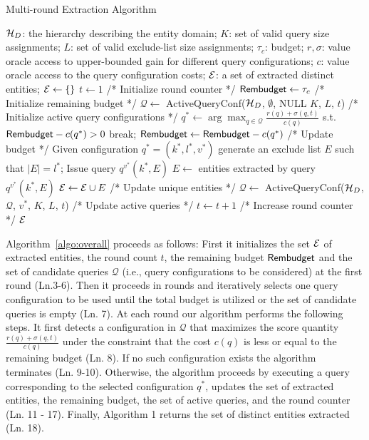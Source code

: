 \begin{algorithm}[h]
\small\caption{Multi-round Extraction Algorithm}
\label{algo:overall}
\begin{algorithmic}[1]
 $\mathcal{H}_D$: the hierarchy describing the entity domain; $K$: set of valid query size assignments; $L$: set of valid exclude-list size assignments; $\tau_c$: budget; $r,\sigma$: value oracle access to upper-bounded gain for different query configurations; $c$: value oracle access to the query configuration costs;
 $\mathcal{E}$: a set of extracted distinct entities;
\STATE $\mathcal{E} \leftarrow \{\}$
\STATE $t \leftarrow 1$ /* Initialize round counter */
\STATE ${\sf Rembudget} \leftarrow \tau_c$ /* Initialize remaining budget */
\STATE $\mathcal{Q} \leftarrow$ {\sf ActiveQueryConf($\mathcal{H}_D$, $\emptyset$, NULL $K$, $L$, $t$)} /* Initialize active query configurations */
	\STATE $q^* \leftarrow \arg\max_{q \in {\mathcal{Q}}} \frac{r(q)+\sigma(q,t)}{c(q)}$ s.t. ${\sf Rembudget} - c(q^*) >0$
		\STATE break;
	\ENDIF
	\STATE ${\sf Rembudget} \leftarrow {\sf Rembudget} - c(q^*)$ /* Update budget */
	\STATE Given configuration $q^* = (k^*,l^*,v^*)$ generate an exclude list $E$ such that $|E| = l^*$; 
	\STATE Issue query $q^{v^{*}}(k^*,E)$
	\STATE $E \leftarrow$ entities extracted by query $q^{v^{*}}(k^*,E)$
	\STATE $\mathcal{E} \leftarrow \mathcal{E} \cup E$ /* Update unique entities */
	\STATE $\mathcal{Q} \leftarrow$ {\sf ActiveQueryConf($\mathcal{H}_D$, $\mathcal{Q}$, $v^*$, $K$, $L$, $t$)} /* Update active queries */
	\STATE $t \leftarrow t + 1$ /* Increase round counter */
\ENDWHILE
\RETURN $\mathcal{E}$
\end{algorithmic}
\end{algorithm}

Algorithm~\ref{algo:overall} proceeds as follows: First it initializes the set $\mathcal{E}$ of extracted entities, the round count $t$, the remaining budget ${\sf Rembudget}$ and the set of candidate queries $\mathcal{Q}$ (i.e., query configurations to be considered) at the first round (Ln.3-6). Then it proceeds in rounds and iteratively selects one query configuration to be used until the total budget is utilized or the set of candidate queries is empty (Ln. 7). At each round our algorithm performs the following steps. It first detects a configuration in $\mathcal{Q}$ that maximizes the score quantity $\frac{r(q) + \sigma(q,t)}{c(q)}$ under the constraint that the cost $c(q)$ is less or equal to the remaining budget (Ln. 8). If no such configuration exists the algorithm terminates (Ln. 9-10). Otherwise, the algorithm proceeds by executing a query corresponding to the selected configuration $q^*$, updates the set of extracted entities, the remaining budget, the set of active queries, and the round counter (Ln. 11 - 17). Finally, Algorithm 1 returns the set of distinct entities extracted (Ln. 18). 

